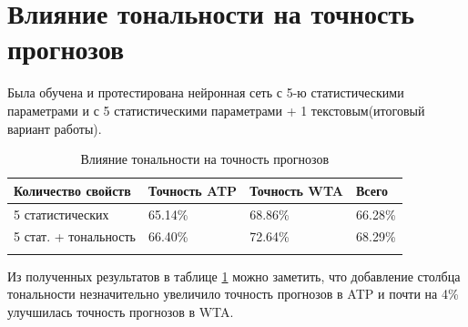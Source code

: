 \section{Влияние тональности на точность прогнозов}
Была обучена и протестирована нейронная сеть с 5-ю статистическими параметрами и с 5 статистическими параметрами + 1 текстовым(итоговый вариант работы).
\begin{longtable}{|l|l|l|l|}

			
			\hline
			
			Количество свойств& Точность ATP & Точность WTA & Всего  \\
			
			\hline 
			
			5 статистических & 65.14\% & 68.86\%&  66.28\% \\ \hline
			5 стат. + тональность   & 66.40\%&72.64\% & 68.29\%   \\
			
			
			\hline
				\caption{Влияние тональности на точность прогнозов}
	\label{tab:tabletone}

	
\end{longtable}
Из полученных результатов в таблице \ref{tab:tabletone} можно заметить, что добавление столбца тональности незначительно увеличило точность прогнозов в ATP и почти на 4\% улучшилась точность прогнозов в WTA.
\bigskip
\bigskip
\pagebreak


